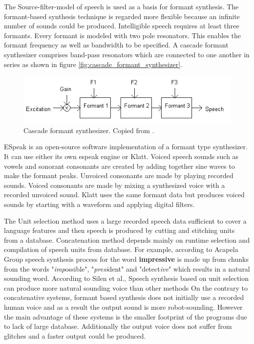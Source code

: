 \documentclass[11pt,a4paper,oneside,article]{memoir}
\begin{document}
The Source-filter-model of speech is used as a basis for formant synthesis. The formant-based synthesis technique is regarded more flexible because an infinite number of sounds could be produced. Intelligible speech requires at least three formants. Every formant is modeled with two pole resonators. This enables the formant frequency as well as bandwidth to be specified. A cascade formant synthesizer comprises band-pass resonators which are connected to one another in series \cite{hut} as shown in figure \vref{fig:cascade_formant_synthesizer}.

\begin{figure}[h]
  \centering
  \includegraphics[width=15cm]{cascade_formant_synthesizer}
  \caption{Cascade formant synthesizer. Copied from \cite{hut}.}
  \label{fig:cascade_formant_synthesizer}
\end{figure}


ESpeak is an open-source software implementation of a formant type synthesizer. It can use either its own espeak engine or Klatt. Voiced speech sounds such as vowels and sonorant consonants are created by adding together sine waves to make the formant peaks. Unvoiced consonants are made by playing recorded sounds. Voiced consonants are made by mixing a synthesized voice with a recorded unvoiced sound. Klatt uses the same formant data but produces voiced sounds by starting with a waveform and applying digital filters. \cite{espeak}

The Unit selection method uses a large recorded speech data sufficient to cover a language features and then speech is produced by cutting and stitching units from a database\cite{chala}. Concatenation method depends mainly on runtime selection and compilation of speech units from database. For example, according to Acapela Group speech synthesis process for the word \textbf{impressive} is made up from chunks from the words "\emph{imp}ossible", "\emph{presi}dent" and "detect\emph{ive}" which results in a natural sounding word.
According to Silen et al., Speech synthesis based on unit selection can produce more natural sounding voice than other methods\cite[1]{silen} 
On the contrary to concatenative systems, formant based synthesis does not initially use a recorded human voice and as a result the output sound is more robot-sounding. However the main advantage of these systems is the smaller footprint of the programs due to lack of large database. Additionally the output voice does not suffer from glitches and a faster output could be produced.\cite{allen}
\end{document}
